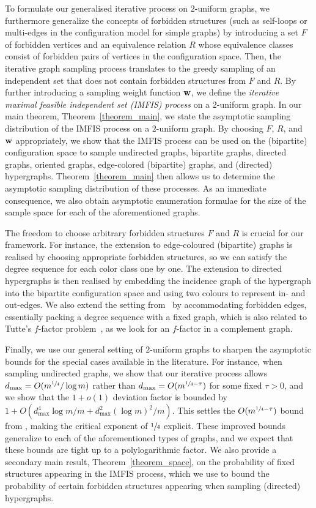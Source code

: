 \documentclass{article}
\theoremstyle{plain}
\theoremstyle{remark}
\theoremstyle{plain}
\numberwithin{equation}{section}
\renewcommand{\b}{{\bf{w}}}
\begin{document}
	
	To formulate our generalised iterative process on $2$-uniform graphs, we
	furthermore generalize the concepts of forbidden structures (such as self-loops or multi-edges in the configuration model for simple graphs) by introducing a set $F$ of forbidden vertices and an equivalence relation $R$ whose equivalence classes consist of forbidden pairs of vertices in the configuration space.  Then, the iterative graph sampling process translates to the greedy sampling of an independent set that does not contain forbidden structures from $F$ and $R$. By further introducing a sampling weight function $\b$, we define the \emph{iterative maximal feasible independent set (IMFIS) process} on a $2$-uniform graph. In our main theorem, Theorem~\ref{theorem_main}, we state the asymptotic sampling distribution of the IMFIS process on a $2$-uniform graph. By choosing $F$, $R$, and $\b$ appropriately, we show that the IMFIS process can be used on the (bipartite) configuration space to sample undirected graphs, bipartite graphs, directed graphs, oriented graphs, edge-colored (bipartite) graphs, and (directed) hypergraphs. Theorem~\ref{theorem_main} then allows us to determine the asymptotic sampling distribution of these processes. As an immediate consequence, we also obtain asymptotic enumeration formulae for the size of the sample space for each of the aforementioned graphs. 
	
	The freedom to choose arbitrary forbidden structures $F$ and $R$ is crucial for our framework. For instance, the extension to edge-coloured (bipartite) graphs is realised by choosing appropriate forbidden structures, so we can satisfy the degree sequence for each color class one by one. The extension to directed hypergraphs is then realised by embedding the incidence graph of the hypergraph into the bipartite configuration space and using two colours to represent in- and out-edges. We also extend the setting from~\cite{Bayati} by accommodating forbidden edges, essentially packing a degree sequence with a fixed graph, which is also related to Tutte's $f$-factor problem~\cite{Tutte1952}, as we look for an $f$-factor in a complement graph.
	
	Finally, we use our general setting of $2$-uniform graphs to sharpen the asymptotic bounds for the special cases available in the literature. For instance, when sampling undirected graphs, we show that our iterative process allows $d_{\max}=O(m^{\sfrac14}/\log m)$ rather than $d_{\max}=O(m^{\sfrac14-\tau})$ for some fixed $\tau>0$, and we show that the $1+o(1)$ deviation factor is bounded by $1+O(d_{\max}^4\log m/m+d_{\max}^2(\log m)^2/m)$. This settles the $O(m^{\sfrac14-\tau})$ bound from \cite{Bayati}, making the critical exponent of $\sfrac14$ explicit. These improved bounds generalize to each of the aforementioned types of graphs, and we expect that these bounds are tight up to a polylogarithmic factor. We also provide a secondary main result, Theorem~\ref{theorem_space}, on the probability of fixed structures appearing in the IMFIS process, which we use to bound the probability of certain forbidden structures appearing when sampling (directed) hypergraphs.
	
\end{document}
